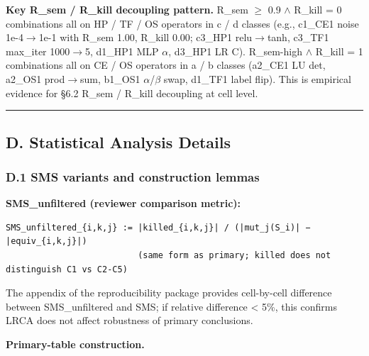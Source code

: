 \documentclass[review,12pt,authoryear]{elsarticle}
\begin{document}
\textbf{Key R\_sem / R\_kill decoupling pattern.} R\_sem $\geq$ 0.9 $\wedge$ R\_kill
= 0 combinations all on HP / TF / OS operators in c / d classes (e.g.,
c1\_CE1 noise 1e-4$\to$1e-1 with R\_sem 1.00, R\_kill 0.00; c3\_HP1
relu$\to$tanh, c3\_TF1 max\_iter 1000$\to$5, d1\_HP1 MLP $\alpha$, d3\_HP1 LR C).
R\_sem-high $\wedge$ R\_kill = 1 combinations all on CE / OS operators in a / b
classes (a2\_CE1 LU det, a2\_OS1 prod$\to$sum, b1\_OS1 $\alpha$/$\beta$ swap, d1\_TF1
label flip). This is empirical evidence for §6.2 R\_sem / R\_kill
decoupling at cell level.

\begin{center}\rule{0.5\linewidth}{0.5pt}\end{center}

\subsection{D. Statistical Analysis
Details}\label{d.-statistical-analysis-details}

\subsubsection{D.1 SMS variants and construction
lemmas}\label{d.1-sms-variants-and-construction-lemmas}

\textbf{SMS\_unfiltered (reviewer comparison metric):}

\begin{verbatim}
SMS_unfiltered_{i,k,j} := |killed_{i,k,j}| / (|mut_j(S_i)| − |equiv_{i,k,j}|)
                          (same form as primary; killed does not distinguish C1 vs C2-C5)
\end{verbatim}

The appendix of the reproducibility package provides cell-by-cell
difference between SMS\_unfiltered and SMS; if relative difference
\textless{} 5\%, this confirms LRCA does not affect robustness of
primary conclusions.

\textbf{Primary-table construction.}
\end{document}
